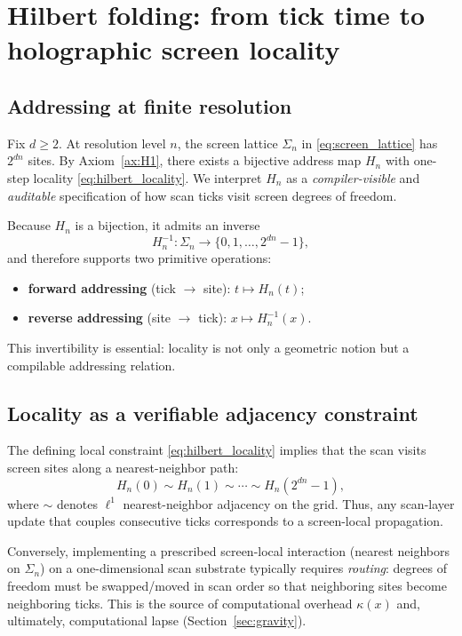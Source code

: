 
\section{Hilbert folding: from tick time to holographic screen locality}
\label{sec:hilbert_folding}

\subsection{Addressing at finite resolution}
\label{sec:finite_resolution_addressing}

Fix $d\ge 2$.
At resolution level $n$, the screen lattice $\Sigma_n$ in \eqref{eq:screen_lattice} has $2^{dn}$ sites.
By Axiom~\ref{ax:H1}, there exists a bijective address map $H_n$ with one-step locality \eqref{eq:hilbert_locality}.
We interpret $H_n$ as a \emph{compiler-visible} and \emph{auditable} specification of how scan ticks visit screen degrees of freedom.

Because $H_n$ is a bijection, it admits an inverse
\[
H_n^{-1}:\Sigma_n\to\{0,1,\dots,2^{dn}-1\},
\]
and therefore supports two primitive operations:
\begin{itemize}
\item \textbf{forward addressing} (tick $\to$ site): $t\mapsto H_n(t)$;
\item \textbf{reverse addressing} (site $\to$ tick): $x\mapsto H_n^{-1}(x)$.
\end{itemize}
This invertibility is essential: locality is not only a geometric notion but a compilable addressing relation.

\subsection{Locality as a verifiable adjacency constraint}
\label{sec:hilbert_locality_property}

The defining local constraint \eqref{eq:hilbert_locality} implies that the scan visits screen sites along a nearest-neighbor path:
\[
H_n(0)\sim H_n(1)\sim \cdots \sim H_n(2^{dn}-1),
\]
where $\sim$ denotes $\ell^1$ nearest-neighbor adjacency on the grid.
Thus, any scan-layer update that couples consecutive ticks corresponds to a screen-local propagation.

Conversely, implementing a prescribed screen-local interaction (nearest neighbors on $\Sigma_n$) on a one-dimensional scan substrate typically requires \emph{routing}:
degrees of freedom must be swapped/moved in scan order so that neighboring sites become neighboring ticks.
This is the source of computational overhead $\kappa(x)$ and, ultimately, computational lapse (Section~\ref{sec:gravity}).

